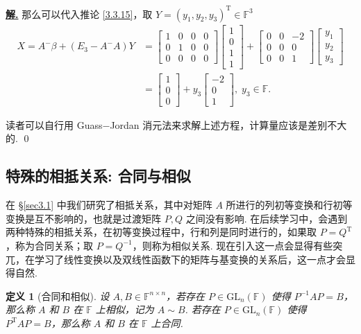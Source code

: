 \documentclass[10pt,openany]{article}
\theoremstyle{thmstyle} %
\theoremstyle{defstyle} %
\newtheorem{definition}[theorem]{定义}
\theoremstyle{prostyle} %
\theoremstyle{exastyle}
\theoremstyle{remstyle}
\newenvironment{solution}{\par\underline{\textbf{解.}} \;\fangsong}{\qed\par}
\newcommand{\T}{^{\text{T}}}
\newcommand{\F}{\mathbb{F}}
\newcommand{\gfn}{\text{GL}_n(\mathbb{F})}
\newcommand{\n}{^{n \times n}}
\begin{document}
\begin{solution}
	那么可以代入推论 \ref{3.3.15}，取 \( Y=(y_1,y_2,y_3)\T \in \F^3 \)
	\begin{align*}
		X=A^{-}\beta+(E_3-A^{-}A)Y&= \begin{bmatrix}
			1 & 0 & 0 & 0 \\
			0 & 1 & 0 & 0 \\
			0 & 0 & 0 & 0
		\end{bmatrix}\begin{bmatrix}
			1 \\ 0 \\ 1 \\ 1
		\end{bmatrix}+\begin{bmatrix}
		0 & 0 & -2 \\
		0 & 0 & 0 \\
		0 & 0 & 1 
		\end{bmatrix}\begin{bmatrix}
		y_1 \\ y_2 \\ y_3
		\end{bmatrix} \\
		&= \begin{bmatrix}
			1 \\ 0 \\ 0
		\end{bmatrix}+y_3\begin{bmatrix}
		-2 \\ 0 \\ 1
		\end{bmatrix}, \; y_3 \in \F.
	\end{align*}
	
	读者可以自行用 Guass\(-\)Jordan 消元法来求解上述方程，计算量应该是差别不大的.
\end{solution}



\subsection{特殊的相抵关系: 合同与相似}

在 \S \ref{sec3.1} 中我们研究了相抵关系，其中对矩阵 \( A \) 所进行的列初等变换和行初等变换是互不影响的，也就是过渡矩阵 \( P,Q \) 之间没有影响. 在后续学习中，会遇到两种特殊的相抵关系，在初等变换过程中，行和列是同时进行的，如果取 \( P=Q\T \)，称为合同关系；取 \( P=Q^{-1} \)，则称为相似关系. 现在引入这一点会显得有些突兀，在学习了线性变换以及双线性函数下的矩阵与基变换的关系后，这一点才会显得自然.

\begin{definition}[合同和相似]
	设 \( A, B \in \F\n \)，若存在 \( P \in \gfn \) 使得 \( P^{-1}AP=B \)，那么称 \( A \) 和 \( B \) 在 \( \F \) 上相似，记为 \( A \sim B \). 若存在 \( P \in \gfn \) 使得 \( P\T AP=B \)，那么称 \( A \) 和 \( B \) 在 \( \F \) 上合同.
\end{definition}
\end{document}
